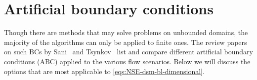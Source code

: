 \documentclass{article}
\numberwithin{equation}{section}
\begin{document}
%
%
%
%
\section{Artificial boundary conditions}\label{sec:artificial-bc}
Though there are methods that may solve problems on unbounded domains, the majority of the algorithms can only be applied to finite ones. 
The review papers on such BCs by Sani~\cite{Sani:1994} and Tsynkov~\cite{Tsynkov:1998} list and compare different artificial boundary conditions (ABC) applied to the various flow scenarios. Below we will discuss the options that are most applicable to \cref{eqs:NSE-dsm-bl-dimensional}. 
\end{document}
